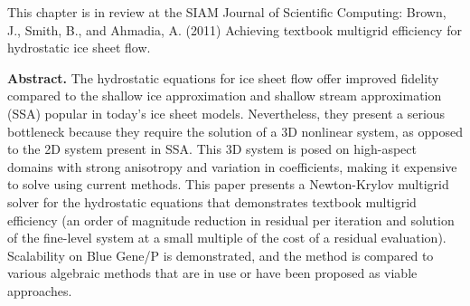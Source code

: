 \textsf{This chapter is in review at the SIAM Journal of Scientific Computing: Brown, J., Smith, B., and Ahmadia, A. (2011) Achieving textbook multigrid efficiency for hydrostatic ice sheet flow.}
\vspace{0.5cm}

\graphicspath{{/home/jed/tme-ice/figures/}}

\textbf{Abstract.}
The hydrostatic equations for ice sheet flow offer improved fidelity compared to the shallow ice approximation and shallow stream approximation (SSA) popular in today's ice sheet models. Nevertheless, they present a serious bottleneck because they require the solution of a 3D nonlinear system, as opposed to the 2D system present in SSA.  This 3D system is posed on high-aspect domains with strong anisotropy and variation in coefficients, making it expensive to solve using current methods.  This paper presents a Newton-Krylov multigrid solver for the hydrostatic equations that demonstrates textbook multigrid efficiency (an order of magnitude reduction in residual per iteration and solution of the fine-level system at a small multiple of the cost of a residual evaluation).  Scalability on Blue Gene/P is demonstrated, and the method is compared to various algebraic methods that are in use or have been proposed as viable approaches.


